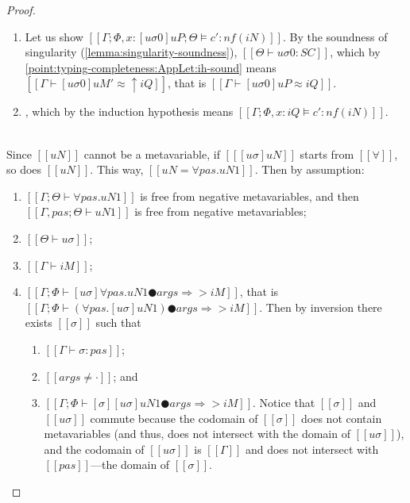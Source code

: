 \begin{proof}
\begin{caseof}
\begin{enumerate}
                \item Let us show $[[Γ; Φ, x:[uσ0]uP ; Θ ⊨ c' : nf(iN)]]$.
                    By the soundness of singularity 
                    (\cref{lemma:singularity-soundness}),
                    $[[Θ ⊢ uσ0 : SC]]$,
                    which by \ref{point:typing-completeness:AppLet:ih-sound}
                    means $[[Γ ⊢ [uσ0]uM' ≈ ↑iQ]]$,
                    that is $[[Γ ⊢ [uσ0]uP ≈ iQ]]$.

                \item 
                    \label{point:typing-completeness:AppLet:body},
                    which by the induction hypothesis means
                    $[[Γ; Φ, x:iQ ⊨ c' : nf(iN)]]$.

            \end{enumerate}









        \item {}\\
            Since $[[uN]]$ cannot be a metavariable,  
            if $[[ [uσ]uN ]]$ starts from $[[∀]]$,
            so does $[[uN]]$. This way,
            $[[uN = ∀pas.uN1]]$.
            Then by assumption:
            \begin{enumerate}
                \item $[[Γ; Θ ⊢ ∀pas.uN1]]$ is free from negative metavariables, 
                    and then $[[Γ, pas; Θ ⊢ uN1]]$ is free from negative metavariables;
                \item $[[Θ ⊢ uσ]]$;
                \item $[[Γ ⊢ iM]]$;
                \item $[[Γ; Φ ⊢ [uσ]∀pas.uN1 ● args ⇒> iM]]$, 
                    \label{point:typing-completeness-forall-app-inversion}
                    that is $[[Γ; Φ ⊢ (∀pas.[uσ]uN1) ● args ⇒> iM]]$.
                    Then by inversion there exists $[[σ]]$ such that 
                    \begin{enumerate}
                        \item $[[Γ ⊢ σ : pas]]$;
                        \item $[[args ≠ ·]]$; and
                        \item $[[Γ ; Φ ⊢ [σ][uσ]uN1 ● args ⇒> iM]]$.
                            \label{point:typing-completeness-forall-app-inversion-2}
                            Notice that $[[σ]]$ and $[[uσ]]$ commute because 
                            the codomain of $[[σ]]$ does not contain
                            metavariables (and thus, does not intersect with 
                            the domain of $[[uσ]]$), and the codomain of $[[uσ]]$ is 
                            $[[Γ]]$ and does not intersect with $[[pas]]$---the domain of $[[σ]]$.


\end{enumerate}
\end{enumerate}
\end{caseof}
\end{proof}
